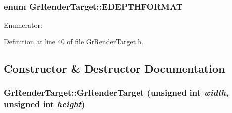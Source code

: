 \begin{CompactItemize}
{\subsubsection[{EDEPTHFORMAT}]{\setlength{\rightskip}{0pt plus 5cm}enum {\bf GrRenderTarget::EDEPTHFORMAT}}}
\label{class_gr_render_target_6331f1f98584176a8d0e3c6c4795f07a}


\begin{Desc}
\item[Enumerator: ]\par
\begin{description}
\item[{\em 
\hypertarget{class_gr_render_target_6331f1f98584176a8d0e3c6c4795f07a4b47d4a30a8ae3ddc30ccbaf9d6d02d5}{
EDF\_\-DEPTH}
\label{class_gr_render_target_6331f1f98584176a8d0e3c6c4795f07a4b47d4a30a8ae3ddc30ccbaf9d6d02d5}
}]\item[{\em 
\hypertarget{class_gr_render_target_6331f1f98584176a8d0e3c6c4795f07a6d338feaeca1aeb33d5baaa5856df237}{
EDF\_\-DEPTHSTENCIL}
\label{class_gr_render_target_6331f1f98584176a8d0e3c6c4795f07a6d338feaeca1aeb33d5baaa5856df237}
}]\end{description}
\end{Desc}



Definition at line 40 of file GrRenderTarget.h.

\subsection{Constructor \& Destructor Documentation}
\hypertarget{class_gr_render_target_619b983e8beea92949165f6c906461d6}{
\subsubsection[{GrRenderTarget}]{\setlength{\rightskip}{0pt plus 5cm}GrRenderTarget::GrRenderTarget (unsigned int {\em width}, \/  unsigned int {\em height})}}
\label{class_gr_render_target_619b983e8beea92949165f6c906461d6}





\end{CompactItemize}
